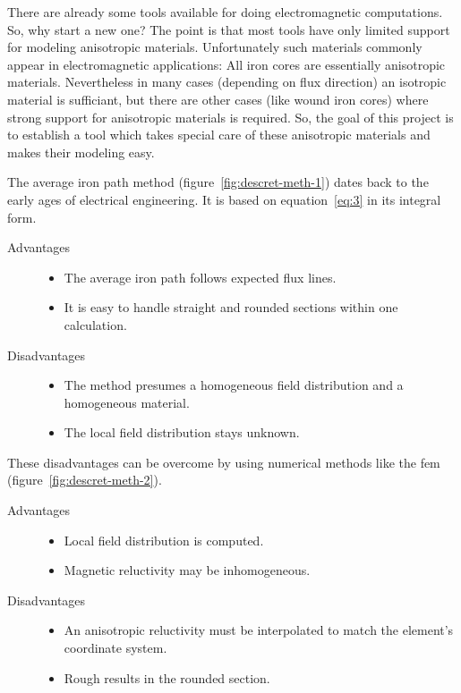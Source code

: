 There are already some tools available for doing electromagnetic
computations.  So, why start a new one?  The point is that most tools
have only limited support for modeling anisotropic materials.
Unfortunately such materials commonly appear in electromagnetic
applications: All iron cores are essentially anisotropic materials.
Nevertheless in many cases (depending on flux direction) an isotropic
material is sufficiant, but there are other cases (like wound iron
cores) where strong support for anisotropic materials is required.
So, the goal of this project is to establish a tool which takes
special care of these anisotropic materials and makes their modeling
easy. \par
The average iron path method (figure~\ref{fig:descret-meth-1}) dates
back to the early ages of electrical engineering.  It is based on
equation~\eqref{eq:3} in its integral form.
\begin{description}
\item[Advantages] \hfill
  \begin{itemize}
  \item The average iron path follows expected flux lines.
  \item It is easy to handle straight and rounded sections within one
    calculation.
  \end{itemize}
\item[Disadvantages] \hfill
  \begin{itemize}
  \item The method presumes a homogeneous field distribution and a
    homogeneous material.
  \item The local field distribution stays unknown.
  \end{itemize}
\end{description}
These disadvantages can be overcome by using numerical methods like
the \gls{fem} (figure~\ref{fig:descret-meth-2}).
\begin{description}
\item[Advantages] \hfill
  \begin{itemize}
  \item Local field distribution is computed.
  \item Magnetic reluctivity may be inhomogeneous.
  \end{itemize}
\item[Disadvantages] \hfill
  \begin{itemize}
  \item An anisotropic reluctivity must be interpolated to match the
    element's coordinate system.
  \item Rough results in the rounded section.
  \end{itemize}
\end{description}

